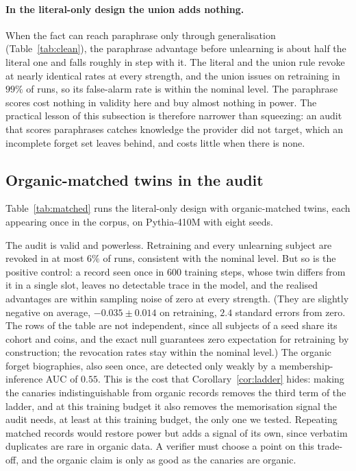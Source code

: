 \paragraph{In the literal-only design the union adds nothing.} When the fact can reach
paraphrase only through generalisation (Table~\ref{tab:clean}), the paraphrase advantage
before unlearning is about half the literal one and falls roughly in step with it. The
literal and the union rule revoke at nearly identical rates at every strength, and the
union issues on retraining in $99\%$ of runs, so its false-alarm rate is within the
nominal level. The paraphrase scores cost nothing in validity here and buy almost
nothing in power. The practical lesson of this subsection is therefore narrower than squeezing: an
audit that scores paraphrases catches knowledge the provider did not target, which an
incomplete forget set leaves behind, and costs little when there is none.

\subsection{Organic-matched twins in the audit}\label{sec:exp-matched}

Table~\ref{tab:matched} runs the literal-only design with organic-matched twins, each
appearing once in the corpus, on Pythia-410M with eight seeds.

\begin{table}[t]
\centering\small
\caption{Organic-matched twins, literal-only design, Pythia-410M, eight seeds. Columns as
in Table~\ref{tab:clean}.}
\label{tab:matched}
\footnotesize\setlength{\tabcolsep}{3pt}
\end{table}

The audit is valid and powerless. Retraining and every unlearning subject are revoked in
at most $6\%$ of runs, consistent with the nominal level. But so is the positive control:
a record seen once in $600$ training steps, whose twin differs from it in a single slot,
leaves no detectable trace in the model, and the realised advantages are within
sampling noise of zero at every strength. (They are slightly negative on average,
$-0.035\pm0.014$ on retraining, $2.4$ standard errors from zero. The rows of the table are
not independent, since all subjects of a seed share its cohort and coins, and the exact
null guarantees zero expectation for retraining by construction; the revocation rates stay
within the nominal level.) The organic forget biographies, also seen once, are detected only weakly by a
membership-inference AUC of $0.55$. This is the cost that Corollary~\ref{cor:ladder}
hides: making the canaries indistinguishable from organic records removes the third term
of the ladder, and at this training budget it also removes the memorisation signal the
audit needs, at least at this training budget, the only one we tested. Repeating matched
records would restore power but adds a signal of its own,
since verbatim duplicates are rare in organic data. A verifier must choose a point on this
trade-off, and the organic claim is only as good as the canaries are organic.



